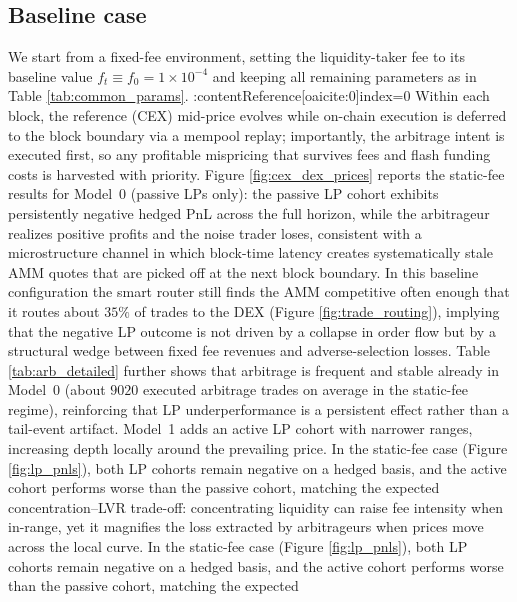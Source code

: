 \documentclass[11pt]{article}
\begin{document}
\iffalse
\subsection{Baseline case}
We start from a fixed-fee environment, setting the liquidity-taker fee to its baseline value $f_t \equiv f_0 = 1\times 10^{-4}$ 
and keeping all remaining parameters as in Table \ref{tab:common_params}. :contentReference[oaicite:0]{index=0} Within each block, the reference (CEX) 
mid-price evolves while on-chain execution is deferred to the block boundary via a mempool replay; importantly, the arbitrage intent 
is executed first, so any profitable mispricing that survives fees and flash funding costs is harvested with priority.  Figure \ref{fig:cex_dex_prices} reports
the static-fee results for Model~0 (passive LPs only): the 
passive LP cohort exhibits persistently negative hedged PnL across the full horizon, while the arbitrageur realizes positive profits
and the noise trader loses, consistent with a microstructure channel in which block-time latency creates systematically stale AMM 
quotes that are picked off at the next block boundary. In this baseline configuration the 
smart router still finds the AMM competitive often enough that it routes about $35\%$ of trades to the DEX (Figure \ref{fig:trade_routing}), implying 
that the negative LP outcome is not driven by a collapse in order flow but by a structural wedge between fixed fee revenues and 
adverse-selection losses. Table \ref{tab:arb_detailed} further shows that arbitrage is frequent and stable 
already in Model~0 (about $9020$ executed arbitrage trades on average in the static-fee regime), reinforcing that LP underperformance 
is a persistent effect rather than a tail-event artifact. Model~1 adds an active LP cohort with 
narrower ranges, increasing depth locally around the prevailing price. In the static-fee case (Figure \ref{fig:lp_pnls}), 
both LP cohorts remain negative on a hedged basis, and the active cohort performs worse than the passive cohort, matching the expected 
concentration--LVR trade-off: concentrating liquidity can raise fee intensity when in-range, yet it magnifies the loss extracted by 
arbitrageurs when prices move across the local curve. In the static-fee case (Figure \ref{fig:lp_pnls}), 
both LP cohorts remain negative on a hedged basis, and the active cohort performs worse than the passive cohort, matching the expected 
\end{document}
